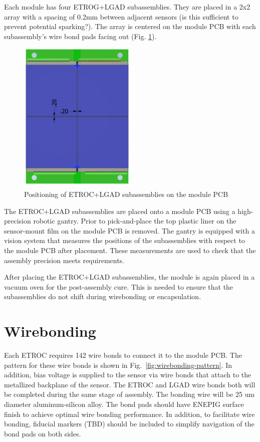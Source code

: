 \documentclass[10pt]{datasheet}
\begin{document}
Each module has four ETROG+LGAD subassemblies. They are placed in a 2x2 array with a spacing of 0.2mm between adjacent sensors (is this sufficient to prevent potential sparking?). The array is centered on the module PCB with each subassembly's wire bond pads facing out (Fig. \ref{fig:mod-with-bbms}).

\begin{figure}[h]
	\centering
	\includegraphics[width=0.5\textwidth,angle=90]{figures/module-with-bbms.png}
	\caption{Positioning of ETROC+LGAD subassemblies on the module PCB}
	\label{fig:mod-with-bbms}	
\end{figure}

The ETROC+LGAD subassemblies are placed onto a module PCB using a high-precision robotic gantry. Prior to pick-and-place the top plastic liner on the sensor-mount film on the module PCB is removed. The gantry is equipped with a vision system that measures the positions of the subassemblies with respect to the module PCB after placement. These measurements are used to check that the assembly precision meets requirements.

After placing the ETROC+LGAD subassemblies, the module is again placed in a vacuum oven for the post-assembly cure. This is needed to ensure that the subassemblies do not shift during wirebonding or encapsulation.


\section{Wirebonding}

Each ETROC requires 142 wire bonds to connect it to the module PCB. The pattern for these wire bonds is shown in Fig.~\ref{fig:wirebonding-pattern}. In addition, bias voltage is supplied to the sensor via wire bonds that attach to the metallized backplane of the sensor. The ETROC and LGAD wire bonds both will be completed during the same stage of assembly. The bonding wire will be 25 um diameter aluminum-silicon alloy. The bond pads should have ENEPIG surface finish to achieve optimal wire bonding performance.  In addition, to facilitate wire bonding, fiducial markers (TBD) should be included to simplify navigation of the bond pads on both sides.
\end{document}
